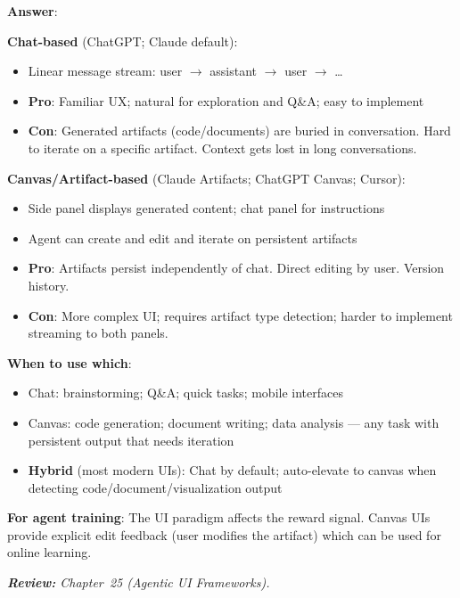 \begin{questionbox}
\textbf{Answer}:

\textbf{Chat-based} (ChatGPT; Claude default):

\begin{itemize}
  \item Linear message stream: user $\to$ assistant $\to$ user $\to$ \ldots{}
  \item \textbf{Pro}: Familiar UX; natural for exploration and Q\&A; easy to implement
  \item \textbf{Con}: Generated artifacts (code/documents) are buried in conversation. Hard to iterate on a specific artifact. Context gets lost in long conversations.
\end{itemize}

\textbf{Canvas/Artifact-based} (Claude Artifacts; ChatGPT Canvas; Cursor):

\begin{itemize}
  \item Side panel displays generated content; chat panel for instructions
  \item Agent can create and edit and iterate on persistent artifacts
  \item \textbf{Pro}: Artifacts persist independently of chat. Direct editing by user. Version history.
  \item \textbf{Con}: More complex UI; requires artifact type detection; harder to implement streaming to both panels.
\end{itemize}

\textbf{When to use which}:

\begin{itemize}
  \item Chat: brainstorming; Q\&A; quick tasks; mobile interfaces
  \item Canvas: code generation; document writing; data analysis --- any task with persistent output that needs iteration
  \item \textbf{Hybrid} (most modern UIs): Chat by default; auto-elevate to canvas when detecting code/document/visualization output
\end{itemize}

\textbf{For agent training}: The UI paradigm affects the reward signal. Canvas UIs provide explicit edit feedback (user modifies the artifact) which can be used for online learning.

\emph{\textbf{Review:} Chapter~25 (Agentic UI Frameworks).}
\end{questionbox}

